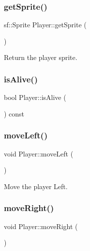 \mbox{\label{class_player_aabef659f696be314cdb705a1ce77ec2a}} 
\subsubsection{\texorpdfstring{get\+Sprite()}{getSprite()}}
{\footnotesize\ttfamily sf\+::\+Sprite Player\+::get\+Sprite (\begin{DoxyParamCaption}{ }\end{DoxyParamCaption})}



Return the player sprite. 

\mbox{\label{class_player_a3966588630ad0a127c9250f985865392}} 
\subsubsection{\texorpdfstring{is\+Alive()}{isAlive()}}
{\footnotesize\ttfamily bool Player\+::is\+Alive (\begin{DoxyParamCaption}{ }\end{DoxyParamCaption}) const\hspace{0.3cm}{\ttfamily [private]}}

\mbox{\label{class_player_ae3bbcf1159bdc059bff1c2513f2505f7}} 
\subsubsection{\texorpdfstring{move\+Left()}{moveLeft()}}
{\footnotesize\ttfamily void Player\+::move\+Left (\begin{DoxyParamCaption}{ }\end{DoxyParamCaption})}



Move the player Left. 

\mbox{\label{class_player_a6a2b68bc4b21d4c4a79a23b498896ec2}} 
\subsubsection{\texorpdfstring{move\+Right()}{moveRight()}}
{\footnotesize\ttfamily void Player\+::move\+Right (\begin{DoxyParamCaption}{ }\end{DoxyParamCaption})}



